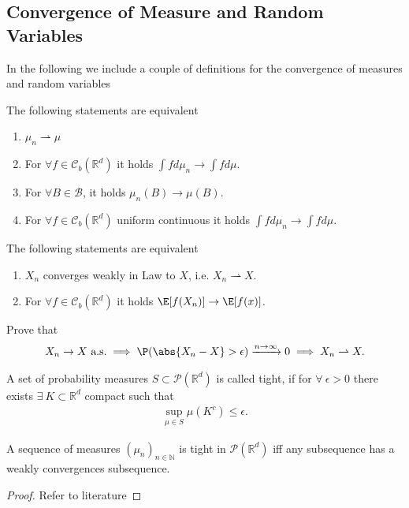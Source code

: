 \subsection{Convergence of Measure and Random Variables}
In the following we include a couple of definitions for the convergence of measures and random variables
\begin{theorem}
 The following statements are equivalent   
 \begin{enumerate}
   \item $\mu_n \rightharpoonup \mu $
   \item For $\forall  f \in  \mathcal{C}_b(\mathbb{R}^{d} )$ it holds $ \int f d\mu_n \to \int  f d\mu$.
\item For $\forall  B \in \mathcal{B} $, it holds $   \mu_n(B) \to  \mu(B)$.
\item For $\forall f \in  \mathcal{C}_b(\mathbb{R}^{d} )$ uniform continuous it holds 
$   \int  f d\mu_n \to  \int f d\mu $.
 \end{enumerate}
\end{theorem}
\begin{theorem}
 The following statements are equivalent  
 \begin{enumerate}
   \item $X_n$ converges weakly in Law to $X$, i.e. $ X_n \rightharpoonup X$.
   \item For $\forall f \in  \mathcal{C}_b(\mathbb{R}^{d} )$ it holds $\E[f(X_n)] \to \E[f(x)]$.
 \end{enumerate}
 \end{theorem}
\begin{exercise}
 Prove that 
 \begin{align*}
   X_n \to  X \ \text{a.s.} \implies \P(\abs{X_n - X} > \epsilon ) \xrightarrow{n\to \infty} 0 \implies X_n \rightharpoonup X
 .\end{align*}
\end{exercise}
\begin{definition}[Tightness]
 A set of probability measures $S \subset  \mathcal{P}(\mathbb{R}^{d} )$  is called tight, if 
 for $\forall \ \epsilon  > 0$ there exists $\exists \  K \subset  \mathbb{R}^{d} $ compact such that 
 \begin{align*}
   \sup_{\mu  \in  S} \mu(K^{c} )  \le  \epsilon 
 .\end{align*}
\end{definition}
\begin{theorem}
  A sequence of measures $(\mu_n)_{n \in  \mathbb{N}}$  is tight in $\mathcal{P}(\mathbb{R}^{d} )$ iff 
  any subsequence has a weakly convergences subsequence.
\end{theorem}
\begin{proof}
 Refer to literature 
\end{proof}
